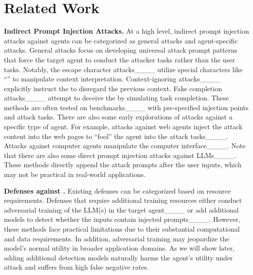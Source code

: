 \section{Related Work}
\label{sec:rw}

\textbf{Indirect Prompt Injection Attacks.}
At a high level, indirect prompt injection attacks against agents can be categorized as general attacks and agent-specific attacks.
General attacks focus on developing universal attack prompt patterns that force the target agent to conduct the attacker tasks rather than the user tasks.
Notably, the escape character attacks____ utilize special characters like ``'' to manipulate context interpretation.
Context-ignoring attacks____ explicitly instruct the \llm to disregard the previous context.
Fake completion attacks____ attempt to deceive the \llm by simulating task completion. 
These methods are often tested on \ipi benchmarks____ with pre-specified injection points and attack tasks.
There are also some early explorations of \llm attacks against a specific type of agent.
For example, attacks against web agents inject the attack content into the web pages to ``fool'' the agent into the attack tasks____. 
Attacks against computer agents manipulate the computer interface____. 
Note that there are also some direct prompt injection attacks against LLMs____.
These methods directly append the attack prompts after the user inputs, which may not be practical in real-world applications.

\textbf{Defenses against \ipi.}
Existing defenses can be categorized based on resource requirements.
Defenses that require additional training resources either conduct adversarial training of the LLM(s) in the target agent____ or add additional models to detect whether the inputs contain injected prompts____. 
However, these methods face practical limitations due to their substantial computational and data requirements.
In addition, adversarial training may jeopardize the model's normal utility in broader application domains.
As we will show later, adding additional detection models naturally harms the agent's utility under attack and suffers from high false negative rates.

